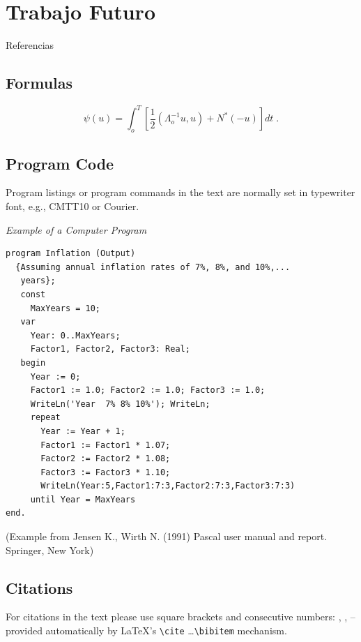 \documentclass[runningheads,a4paper]{llncs}
\begin{document}
\section{Trabajo Futuro}

Referencias



\subsection{Formulas}

\begin{equation}
  \psi (u) = \int_{o}^{T} \left[\frac{1}{2}
  \left(\Lambda_{o}^{-1} u,u\right) + N^{\ast} (-u)\right] dt \;  .
\end{equation}



\subsection{Program Code}

Program listings or program commands in the text are normally set in
typewriter font, e.g., CMTT10 or Courier.

\medskip

\noindent
{\it Example of a Computer Program}
\begin{verbatim}
program Inflation (Output)
  {Assuming annual inflation rates of 7%, 8%, and 10%,...
   years};
   const
     MaxYears = 10;
   var
     Year: 0..MaxYears;
     Factor1, Factor2, Factor3: Real;
   begin
     Year := 0;
     Factor1 := 1.0; Factor2 := 1.0; Factor3 := 1.0;
     WriteLn('Year  7% 8% 10%'); WriteLn;
     repeat
       Year := Year + 1;
       Factor1 := Factor1 * 1.07;
       Factor2 := Factor2 * 1.08;
       Factor3 := Factor3 * 1.10;
       WriteLn(Year:5,Factor1:7:3,Factor2:7:3,Factor3:7:3)
     until Year = MaxYears
end.
\end{verbatim}
%
\noindent
{\small (Example from Jensen K., Wirth N. (1991) Pascal user manual and
report. Springer, New York)}

\subsection{Citations}

For citations in the text please use
square brackets and consecutive numbers: \cite{jour}, \cite{lncschap},
\cite{proceeding1} -- provided automatically
by \LaTeX 's \verb|\cite| \dots\verb|\bibitem| mechanism.
\end{document}
